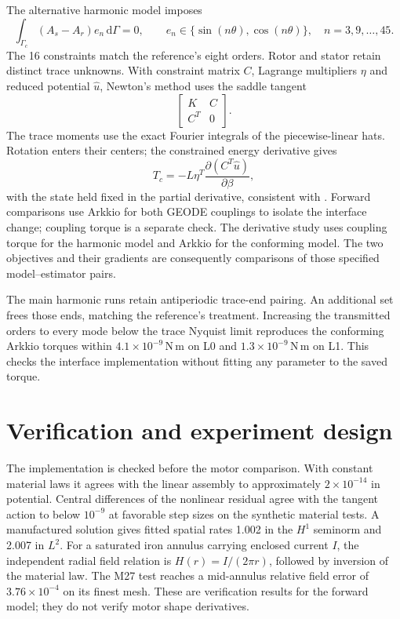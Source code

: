 \documentclass{anvil-paper}
\newcommand{\dd}{\,\mathrm{d}}
\begin{document}
The alternative harmonic model imposes
\begin{equation}
 \int_{\Gamma_c}(A_s-A_r)e_n\dd\Gamma=0,\qquad
 e_n\in\{\sin(n\theta),\cos(n\theta)\},\quad n=3,9,\ldots,45.
\end{equation}
The 16 constraints match the reference's eight orders. Rotor and stator
retain distinct trace unknowns. With constraint matrix $C$, Lagrange
multipliers $\eta$ and reduced potential $\hat u$, Newton's method uses
the saddle tangent
\begin{equation}
 \begin{bmatrix}K&C\\ C^T&0\end{bmatrix}.
\end{equation}
The trace moments use the exact Fourier integrals of the piecewise-linear
hats. Rotation enters their centers; the constrained energy derivative gives
\begin{equation}
 T_c=-L\eta^T\frac{\partial(C^T\hat u)}{\partial\beta},
 \label{eq:couplingtorque}
\end{equation}
with the state held fixed in the partial derivative, consistent with
\citet{egger2022torque}. Forward comparisons use Arkkio for both GEODE
couplings to isolate the interface change; coupling torque is a separate
check. The derivative study uses coupling torque for the harmonic model
and Arkkio for the conforming model. The two objectives and their gradients
are consequently comparisons of those specified model--estimator pairs.

The main harmonic runs retain antiperiodic trace-end pairing. An additional
set frees those ends, matching the reference's treatment. Increasing the
transmitted orders to every mode below the trace Nyquist limit reproduces
the conforming Arkkio torques within $4.1\times10^{-9}$\,N\,m on L0 and
$1.3\times10^{-9}$\,N\,m on L1. This checks the interface implementation
without fitting any parameter to the saved torque.

\section{Verification and experiment design}
The implementation is checked before the motor comparison. With constant
material laws it agrees with the linear assembly to approximately
$2\times10^{-14}$ in potential. Central differences of the nonlinear
residual agree with the tangent action to below $10^{-9}$ at favorable
step sizes on the synthetic material tests. A manufactured solution gives
fitted spatial rates 1.002 in the $H^1$ seminorm and 2.007 in $L^2$.
For a saturated iron annulus carrying enclosed current $I$, the independent
radial field relation is $H(r)=I/(2\pi r)$, followed by inversion of the
material law. The M27 test reaches a mid-annulus relative field error of
$3.76\times10^{-4}$ on its finest mesh. These are verification results
for the forward model; they do not verify motor shape derivatives.
\end{document}
